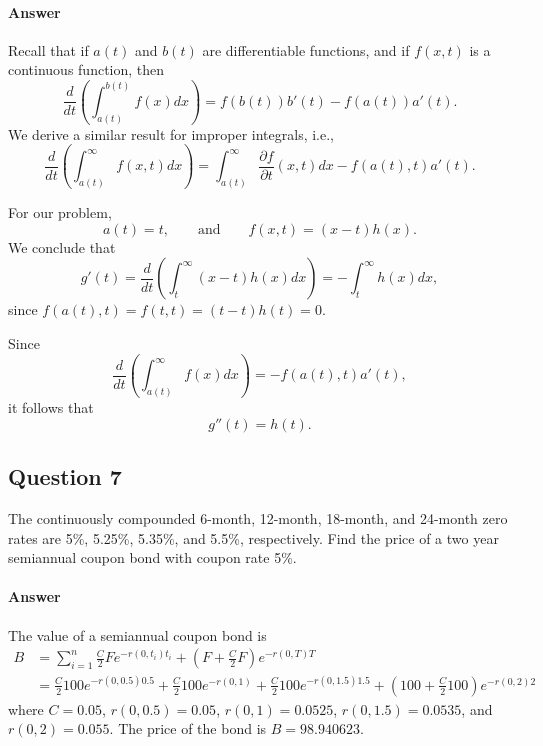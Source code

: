 \paragraph{Answer}
Recall that if $ a(t) $ and $ b(t) $ are differentiable functions, and if
$ f(x, t) $ is a continuous function, then
\begin{equation*}
    \frac{d}{dt} \left( \int_{a(t)}^{b(t)} f(x) dx \right) =
        f(b(t)) b'(t) - f(a(t)) a'(t).
\end{equation*}
We derive a similar result for improper integrals, i.e.,
\begin{equation*}
    \frac{d}{dt} \left( \int_{a(t)}^{\infty} f(x, t) dx \right) =
        \int_{a(t)}^{\infty} \frac{\partial f}{\partial t} (x, t) dx -
        f(a(t), t) a'(t).
\end{equation*}

For our problem,
\begin{equation*}
    a(t) = t, \qquad \text{and} \qquad f(x, t) = (x - t) h(x).
\end{equation*}
We conclude that
\begin{equation*}
    g'(t) = \frac{d}{dt} \left( \int_{t}^{\infty} (x - t) h(x) dx \right) =
        -\int_{t}^{\infty} h(x) dx,
\end{equation*}
since $ f(a(t), t) = f(t, t) = (t - t)h(t) = 0 $.

Since
\begin{equation*}
    \frac{d}{dt} \left( \int_{a(t)}^{\infty} f(x) dx \right) =
        -f(a(t), t) a'(t),
\end{equation*}
it follows that
\begin{equation*}
    g''(t) = h(t).
\end{equation*}

\subsection{Question 7}
The continuously compounded 6-month, 12-month, 18-month, and 24-month zero
    rates are 5\%, 5.25\%, 5.35\%, and 5.5\%, respectively.
Find the price of a two year semiannual coupon bond with coupon rate 5\%.

\paragraph{Answer}
The value of a semiannual coupon bond is
\begin{align*}
    B &= \sum_{i=1}^{n} \frac{C}{2} F e^{-r(0, t_i) t_i} + \left( F +
        \frac{C}{2} F \right) e^{-r(0, T) T} \\
      &= \frac{C}{2} 100 e^{-r(0, 0.5) 0.5} + \frac{C}{2} 100 e^{-r(0, 1)} +
        \frac{C}{2} 100 e^{-r(0, 1.5) 1.5} + \left( 100 + \frac{C}{2} 100
        \right) e^{-r(0, 2) 2}
\end{align*}
where $ C = 0.05 $, $ r(0, 0.5) = 0.05 $, $ r(0, 1) = 0.0525 $,
    $ r(0, 1.5) = 0.0535 $, and $ r(0, 2) = 0.055 $.
The price of the bond is $ B = 98.940623 $.

